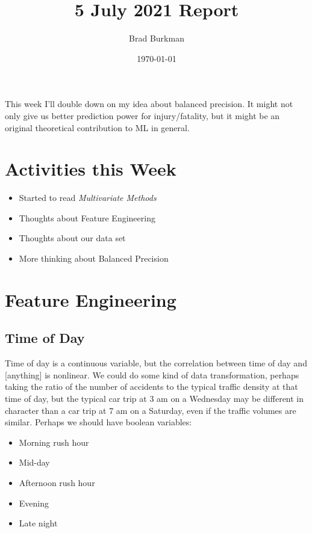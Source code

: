 \documentclass[11pt]{article}
\title{5 July 2021 Report}
\author{Brad Burkman}
\date{\today}
\begin{document}
\setlength{\parindent}{20pt}
\begin{spacing}{1.2}
\maketitle


This week I'll double down on my idea about balanced precision.  It might not only give us better prediction power for injury/fatality, but it might be an original theoretical contribution to ML in general.  

\tableofcontents

\section{Activities this Week}

\begin{itemize}
	\item Started to read {\it Multivariate Methods}
	\item Thoughts about Feature Engineering
	\item Thoughts about our data set
	\item More thinking about Balanced Precision
\end{itemize}

\section{Feature Engineering}

\subsection{Time of Day}

Time of day is a continuous variable, but the correlation between time of day and [anything] is nonlinear.  We could do some kind of data transformation, perhaps taking the ratio of the number of accidents to the typical traffic density at that time of day, but the typical car trip at 3 am on a Wednesday may be different in character than a car trip at 7 am on a Saturday, even if the traffic volumes are similar.  Perhaps we should have boolean variables:

\begin{itemize}
	\item Morning rush hour
	\item Mid-day
	\item Afternoon rush hour
	\item Evening
	\item Late night
\end{itemize}


\end{spacing}
\end{document}
